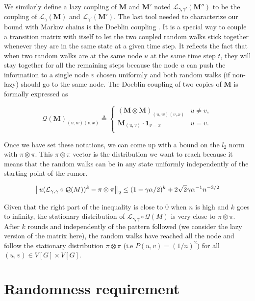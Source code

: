\documentclass[10pt,journal,a4paper]{IEEEtran}
\begin{document}
We similarly define a lazy coupling of $\mathbf{M}$ and $\mathbf{M'}$ noted $\mathcal L_{\gamma, \gamma'}(\mathbf{M''})$ to be the coupling of $\mathcal L_\gamma(\mathbf{M})$ and $\mathcal L_{\gamma'}(\mathbf{M'})$. The last tool needed to characterize our bound with Markov chains is the Doeblin coupling \cite{coupling}. It is a special way to couple a transition matrix with itself to let the two coupled random walks stick together whenever they are in the same state at a given time step. It reflects the fact that when two random walks are at the same node $u$ at the same time step $t$, they will stay together for all the remaining steps because the node $u$ can push the information to a single node $v$ chosen uniformly and both random walks (if non-lazy) should go to the same node. The Doeblin coupling of two copies of $\mathbf{M}$ is formally expressed as

\[
  \mathcal Q(\mathbf{M})_{(u,w)(v,x)} \triangleq \left\{
    \begin{array}{ll}
      (\mathbf{M} \otimes \mathbf{M})_{(u,w)(v,x)} & u \not = v,\\
      \mathbf{M}_{(u,v)} \cdot \mathbf{1}_{v = x} & u = v.\\
    \end{array}
  \right.
\]

Once we have set these notations, we can come up with a bound on the $l_2$ norm with $\pi \otimes \pi$. This $\pi \otimes \pi$ vector is the distribution we want to reach because it means that the random walks can be in any state uniformly independently of the starting point of the rumor.

\[
  \left\lVert u(\mathcal L_{\gamma,\gamma} \circ \mathcal Q(M))^k - \pi \otimes \pi\right\rVert_2 \leq (1 - \gamma \alpha / 2)^k + 2 \sqrt 2 \gamma \alpha^{-1} n^{-3/2}
\]

Given that the right part of the inequality is close to 0 when $n$ is high and $k$ goes to infinity, the stationary distribution of $\mathcal L_{\gamma,\gamma} \circ \mathcal Q(M)$ is very close to $\pi \otimes \pi$. After $k$ rounds and independently of the pattern followed (we consider the lazy version of the matrix here), the random walks have reached all the node and follow the stationary distribution $\pi \otimes \pi$ (i.e $P(u,v)=(1/n)^2$) for all $(u,v) \in V[G] \times V[G]$. 


\section{Randomness requirement}
\end{document}
